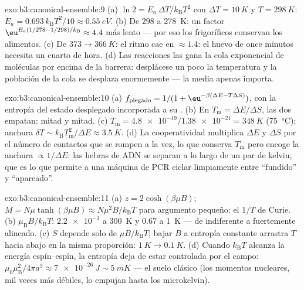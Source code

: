 \begin{solution}{exo:b3:canonical-ensemble:9}
(a) $\ln2 = E_a\,\Delta T/k_{\text{B}}T^2$ con $\Delta T =
\qty{10}{K}$ y $T = \qty{298}{K}$: $E_a =
0.693\,k_{\text{B}}T^2/10 \approx \qty{0.55}{eV}$. (b) De
$298$ a \qty{278}{K}: un factor $\eu^{E_a(1/278 - 1/298)/k_{\text{B}}}
\approx 4.4$ más lento --- por eso los frigoríficos conservan los alimentos.
(c) De $373 \to \qty{366}{K}$: el ritmo cae en $\approx1.4$: el
huevo de once minutos necesita un cuarto de hora. (d) Las reacciones las
gana la cola exponencial de moléculas por encima de la barrera: desplácese
un poco la temperatura y la población de la cola se desplaza
enormemente --- la media apenas importa.
\end{solution}

\begin{solution}{exo:b3:canonical-ensemble:10}
(a) $f_{\text{plegado}} = 1/(1 + \eu^{-\beta(\Delta E -
T\Delta S)})$, con la entropía del estado desplegado incorporada a su
. (b) En $T_{\text{m}} = \Delta E/\Delta S$, las dos
 empatan: mitad y mitad. (c) $T_{\text{m}} =
\num{4.8e-19}/\num{1.38e-21} = \qty{348}{K}$ (\qty{75}{\celsius});
anchura $\delta T \sim k_{\text{B}}T_{\text{m}}^2/\Delta E \approx
\qty{3.5}{K}$. (d) La cooperatividad multiplica $\Delta E$ y
$\Delta S$ por el número de contactos que se rompen a la vez, lo que
conserva $T_{\text{m}}$ pero encoge la anchura $\propto 1/\Delta E$: las
hebras de ADN se separan a lo largo de un par de kelvin, que es lo que
permite a una máquina de PCR ciclar limpiamente entre ``fundido'' y
``apareado''.
\end{solution}

\begin{solution}{exo:b3:canonical-ensemble:11}
(a) $z = 2\cosh(\beta\mu B)$; $M = N\mu\tanh(\beta\mu B) \approx
N\mu^2B/k_{\text{B}}T$ para argumento pequeño: el $1/T$ de Curie. (b)
$\mu_{\text{B}}B/k_{\text{B}}T$: $\num{2.2e-3}$ a \qty{300}{K} y
$0.67$ a \qty{1}{K} --- de indiferente a fuertemente alineado. (c)
$S$ depende solo de $\mu B/k_{\text{B}}T$; bajar $B$ a entropía
constante arrastra $T$ hacia abajo en la misma proporción: $\qty{1}{K} \to
\qty{0.1}{K}$. (d) Cuando $k_{\text{B}}T$ alcanza la energía espín--espín,
la entropía deja de estar controlada por el campo:
$\mu_0\mu_{\text{B}}^2/4\pi a^3 \approx \qty{7e-26}{J} \sim
\qty{5}{mK}$ --- el suelo clásico (los momentos nucleares, mil
veces más débiles, lo empujan hasta los microkelvin).
\end{solution}

